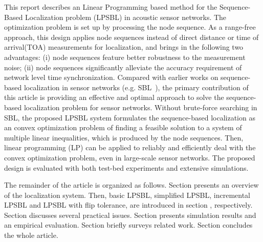 This report describes an Linear Programming based method
for the Sequence-Based Localization problem (LPSBL)  in acoustic sensor networks.
The optimization problem is set up by processing the node sequence. 
As a range-free approach, this design applies node sequences instead of direct distance
or time of arrival(TOA) measurements for localization, and brings in the following two advantages: (i) node sequences feature better
robustness to the measurement noise; (ii) node sequences significantly alleviate the accuracy requirement of network level time synchronization. 
Compared with earlier works on sequence-based localization in sensor
networks (e.g. SBL~\cite{yedavalli2008sequence}), the primary contribution
of this article is providing an effective and optimal approach
to solve the sequence-based localization problem for sensor networks. 
Without brute-force searching in SBL, the proposed LPSBL system formulates the
sequence-based localization as an convex optimization problem
of finding a feasible solution to a system of multiple linear
inequalities, which is produced by the node sequences.
Then, linear programming (LP) can be applied to reliably and efficiently deal with the convex optimization problem,
even in large-scale sensor networks. 
The proposed design is evaluated with both test-bed experiments and extensive simulations. 


The remainder of the article is organized as follows. 
Section \uppercase\expandafter{} presents an overview of the  localization system.
Then, basic LPSBL, simplified LPSBL, incremental LPSBL and LPSBL with flip tolerance, are introduced in section \uppercase\expandafter{}, respectively.
Section \uppercase\expandafter{} discusses several practical issues.
Section \uppercase\expandafter{} presents simulation results and an empirical evaluation. Section \uppercase\expandafter{} briefly surveys related work.
Section \uppercase\expandafter{} concludes the whole article.



